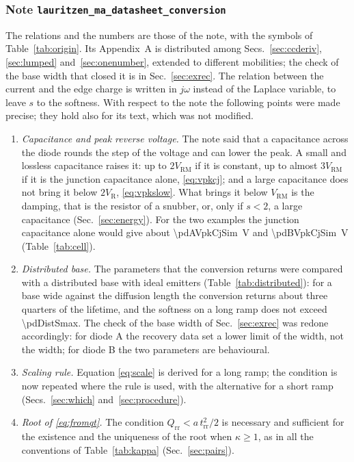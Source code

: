 \documentclass[10pt,a4paper]{scrartcl}
\newcommand{\VR}{V_\mathrm{R}}
\newcommand{\Qrr}{Q_\mathrm{rr}}
\newcommand{\trr}{t_\mathrm{rr}}
\newcommand{\Vrm}{V_\mathrm{RM}}
\begin{document}
\subsubsection*{Note \texttt{lauritzen\_ma\_datasheet\_conversion}}
The relations and the numbers are those of the note, with the symbols of Table~\ref{tab:origin}. Its Appendix~A is distributed among Secs.~\ref{sec:ccderiv}, \ref{sec:lumped} and~\ref{sec:onenumber}, extended to different mobilities; the check of the base width that closed it is in Sec.~\ref{sec:exrec}. The relation between the current and the edge charge is written in $j\omega$ instead of the Laplace variable, to leave $s$ to the softness. With respect to the note the following points were made precise; they hold also for its text, which was not modified.
\begin{enumerate}
\item \emph{Capacitance and peak reverse voltage.} The note said that a capacitance across the diode rounds the step of the voltage and can lower the peak. A small and lossless capacitance raises it: up to $2\Vrm$ if it is constant, up to almost $3\Vrm$ if it is the junction capacitance alone, \eqref{eq:vpkcj}; and a large capacitance does not bring it below $2\VR$, \eqref{eq:vpkslow}. What brings it below $\Vrm$ is the damping, that is the resistor of a snubber, or, only if $s < 2$, a large capacitance (Sec.~\ref{sec:energy}). For the two examples the junction capacitance alone would give about \SI{\pdAVpkCjSim}{\volt} and \SI{\pdBVpkCjSim}{\volt} (Table~\ref{tab:cell}).
\item \emph{Distributed base.} The parameters that the conversion returns were compared with a distributed base with ideal emitters (Table~\ref{tab:distributed}): for a base wide against the diffusion length the conversion returns about three quarters of the lifetime, and the softness on a long ramp does not exceed \num{\pdDistSmax}. The check of the base width of Sec.~\ref{sec:exrec} was redone accordingly: for diode A the recovery data set a lower limit of the width, not the width; for diode B the two parameters are behavioural.
\item \emph{Scaling rule.} Equation \eqref{eq:scale} is derived for a long ramp; the condition is now repeated where the rule is used, with the alternative for a short ramp (Secs.~\ref{sec:which} and~\ref{sec:procedure}).
\item \emph{Root of \eqref{eq:fromqt}.} The condition $\Qrr < a\,\trr^2/2$ is necessary and sufficient for the existence and the uniqueness of the root when $\kappa \geq 1$, as in all the conventions of Table~\ref{tab:kappa} (Sec.~\ref{sec:pairs}).

\end{enumerate}
\end{document}

